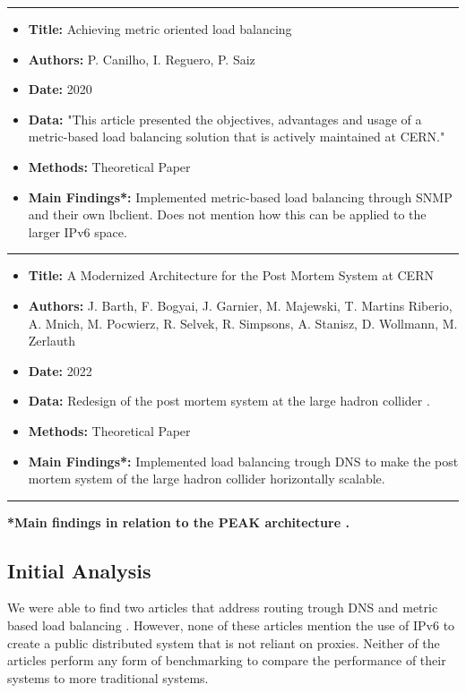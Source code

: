 \documentclass[12pt]{article}
\begin{document}
\newpage

\noindent\rule{\textwidth}{0.4pt}
\begin{itemize}
    \item \textbf{Title:} Achieving metric oriented load balancing \cite{canilhoAchievingMetricOriented2020}
    \item \textbf{Authors:} P. Canilho, I. Reguero, P. Saiz
    \item \textbf{Date:} 2020
    \item \textbf{Data:} "This article presented the objectives, advantages and usage of a metric-based load balancing solution that is actively maintained at CERN." \cite{canilhoAchievingMetricOriented2020}
    \item \textbf{Methods:} Theoretical Paper
    \item \textbf{Main Findings*:} Implemented metric-based load balancing through SNMP and their own lbclient. Does not mention how this can be applied to the larger IPv6 space.
\end{itemize}
\noindent\rule{\textwidth}{0.4pt}
\begin{itemize}
    \item \textbf{Title:} A Modernized Architecture for the Post Mortem System at CERN \cite{barthModernizedArchitecturePost2022}
    \item \textbf{Authors:} J. Barth, F. Bogyai, J. Garnier, M. Majewski, T. Martins Riberio, A. Mnich, M. Pocwierz, R. Selvek, R. Simpsons, A. Stanisz, D. Wollmann, M. Zerlauth
    \item \textbf{Date:} 2022
    \item \textbf{Data:} Redesign of the post mortem system at the large hadron collider \cite{barthModernizedArchitecturePost2022}.
    \item \textbf{Methods:} Theoretical Paper
    \item \textbf{Main Findings*:} Implemented load balancing trough DNS to make the post mortem system of the large hadron collider horizontally scalable.
\end{itemize}
\noindent\rule{\textwidth}{0.4pt}
\textbf{*Main findings in relation to the PEAK architecture \cite{heimonenPreprintPEAKProxy}.}

\subsection{Initial Analysis}
We were able to find two articles that address routing trough DNS and metric based load balancing \cite{heimonenPreprintPEAKProxy,canilhoAchievingMetricOriented2020}. 
However, none of these articles mention the use of IPv6 to create a public distributed system that is not reliant on proxies.
Neither of the articles perform any form of benchmarking to compare the performance of their systems to more traditional systems.
\end{document}
